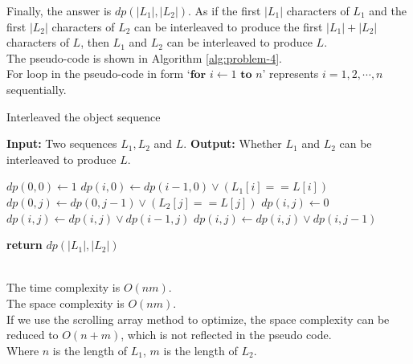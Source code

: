 Finally, the answer is $dp(|L_1|,|L_2|)$. As if the first $|L_1|$ characters of $L_1$ and the first $|L_2|$ characters of $L_2$ can be interleaved to produce the first $|L_1|+|L_2|$ characters of $L$, then $L_1$ and $L_2$ can be interleaved to produce $L$.\\

The pseudo-code is shown in Algorithm \ref{alg:problem-4}.\\
For loop in the pseudo-code in form `$\textbf{for } i \gets 1 \textbf{ to } n$' represents $i=1,2,\cdots,n$ sequentially.
\begin{algorithm}
    \caption{Interleaved the object sequence}
    \begin{algorithmic}[1]
    \State \textbf{Input:} Two sequences $L_1, L_2$ and $L$.
    \State \textbf{Output:} Whether $L_1$ and $L_2$ can be interleaved to produce $L$.
        
    \State $dp(0,0) \gets 1$
        \State $dp(i,0) \gets dp(i-1,0) \lor (L_1[i] == L[i])$
    \EndFor
        \State $dp(0,j) \gets dp(0,j-1) \lor (L_2[j] == L[j])$
    \EndFor
            \State $dp(i,j) \gets 0$
                \State $dp(i,j) \gets dp(i,j) \lor dp(i-1,j)$
            \EndIf
                \State $dp(i,j) \gets dp(i,j) \lor dp(i,j-1)$
            \EndIf
        \EndFor
    \EndFor
    
    \State \textbf{return} $dp(|L_1|,|L_2|)$
    \end{algorithmic}
    \label{alg:problem-4}
\end{algorithm}\\
The time complexity is $O(nm)$.\\
The space complexity is $O(nm)$.\\
If we use the scrolling array method to optimize, the space complexity can be reduced to $O(n+m)$, which is not reflected in the pseudo code.\\
Where $n$ is the length of $L_1$, $m$ is the length of $L_2$.\\

\newpage